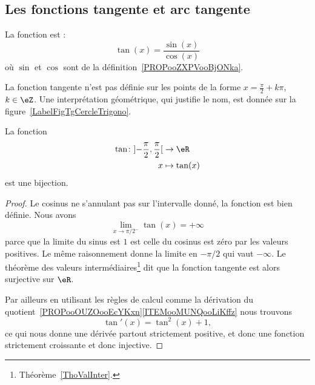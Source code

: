 	\subsection{Les fonctions tangente et arc tangente}

	\begin{definition}
		La fonction  est :
		\begin{equation}
			\tan(x)=\frac{ \sin(x) }{ \cos(x) }
		\end{equation}
		où \( \sin\) et \( \cos\) sont de la définition~\ref{PROPooZXPVooBjONka}.
	\end{definition}
	La fonction tangente n'est pas définie sur les points de la forme \( x=\frac{ \pi }{2}+k\pi\), \( k\in \eZ\). Une interprétation géométrique, qui justifie le nom, est donnée sur la figure~\ref{LabelFigTgCercleTrigono}.
	\newcommand{\CaptionFigTgCercleTrigono}{Interprétation géométrique de la fonction tangente. La tangente de l'angle \( \theta\) est positive (et un peu plus grande que \( 1\)) tandis que celle de la tangente de l'angle \( \varphi\) est négative.}
	

	\begin{proposition}
		La fonction
		\begin{equation}
			\begin{aligned}
				\tan\colon \mathopen] -\frac{ \pi }{ 2 } , \frac{ \pi }{2} \mathclose[ & \to \eR         \\
				x                                                                      & \mapsto \tan(x)
			\end{aligned}
		\end{equation}
		est une bijection.
	\end{proposition}

	\begin{proof}
		Le cosinus ne s'annulant pas sur l'intervalle donné, la fonction est bien définie. Nous avons
		\begin{equation}
			\lim_{x\to \pi/2^-} \tan(x)=+\infty
		\end{equation}
		parce que la limite du sinus est \( 1\) est celle du cosinus est zéro par les valeurs positives. Le même raisonnement donne la limite en \( -\pi/2\) qui vaut \( -\infty\). Le théorème des valeurs intermédiaires\footnote{Théorème~\ref{ThoValInter}.} dit que la fonction tangente est alors surjective sur \( \eR\).

		Par ailleurs en utilisant les règles de calcul comme la dérivation du quotient~\ref{PROPooOUZOooEcYKxn}\ref{ITEMooMUNQooLiKffz} nous trouvons
		\begin{equation}
			\tan'(x)=\tan^2(x)+1,
		\end{equation}
		ce qui nous donne une dérivée partout strictement positive, et donc une fonction strictement croissante et donc injective.
	\end{proof}

